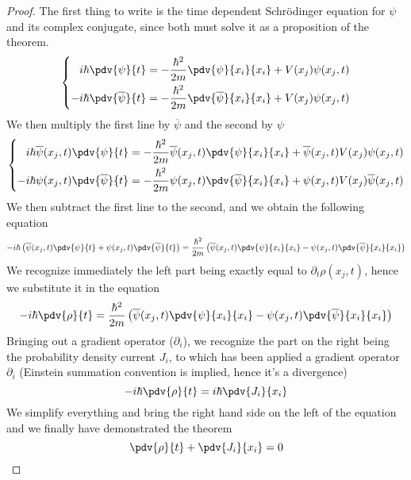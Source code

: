 \documentclass[a4paper, 11pt]{book}
\newcommand{\1}{\opr{\mathds{1}}}
\newcommand{\cc}[1]{\overline{#1}}
\theoremstyle{plain}
\begin{document}
	\begin{proof}
		The first thing to write is the time dependent Schrödinger equation for $\psi$ and its complex conjugate, since both must solve it as a proposition of the theorem.
		\begin{equation*}
			\left\{\begin{aligned}
					i\hbar\pdv{\psi}{t}&=-\frac{\hbar^2}{2m}\pdv{\psi}{x_i}{x_i}+V(x_j)\psi(x_j,t)\\
					-i\hbar\pdv{\overline{\psi}}{t}&=-\frac{\hbar^2}{2m}\pdv{\overline{\psi}}{x_i}{x_i}+V(x_j)\psi(x_j,t)
			\end{aligned}\right.
		\end{equation*}
		We then multiply the first line by $\cc{\psi}$ and the second by $\psi$
		\begin{equation*}
			\left\{\begin{aligned}
				i\hbar\cc{\psi}(x_j,t)\pdv{\psi}{t}&=-\frac{\hbar^2}{2m}\cc{\psi}(x_j,t)\pdv{\psi}{x_i}{x_i}+\cc{\psi}(x_j,t)V(x_j)\psi(x_j,t)\\
				-i\hbar\psi(x_j,t)\pdv{\cc{\psi}}{t}&=-\frac{\hbar^2}{2m}\psi(x_j,t)\pdv{\cc{\psi}}{x_i}{x_i}+\psi(x_j,t)V(x_j)\cc{\psi}(x_j,t)
			\end{aligned}\right.
		\end{equation*}
		We then subtract the first line to the second, and we obtain the following equation
		\begin{equation*}
			-i\hbar\left( \cc{\psi}(x_j,t)\pdv{\psi}{t}+\psi(x_j,t)\pdv{\cc{\psi}}{t} \right)=\frac{\hbar^2}{2m}\left( \cc{\psi}(x_j,t)\pdv{\psi}{x_i}{x_i}-\psi(x_j,t)\pdv{\cc{\psi}}{x_i}{x_i} \right)
		\end{equation*}
		We recognize immediately the left part being exactly equal to $\partial_t\rho(x_j,t)$, hence we substitute it in the equation
		\begin{equation*}
			-i\hbar\pdv{\rho}{t}=\frac{\hbar^2}{2m}\left( \cc{\psi}(x_j,t)\pdv{\psi}{x_i}{x_i}-\psi(x_j,t)\pdv{\cc{\psi}}{x_i}{x_i} \right)
		\end{equation*}
		Bringing out a gradient operator ($\partial_i$), we recognize the part on the right being the probability density current $J_i$, to which has been applied a gradient operator $\partial_i$ (Einstein summation convention is implied, hence it's a divergence)
		\begin{equation*}
			-i\hbar\pdv{\rho}{t}=i\hbar\pdv{J_i}{x_i}
		\end{equation*}
		We simplify everything and bring the right hand side on the left of the equation and we finally have demonstrated the theorem
		\begin{equation*}
			\pdv{\rho}{t}+\pdv{J_i}{x_i}=0
		\end{equation*}
	\end{proof}
\end{document}
